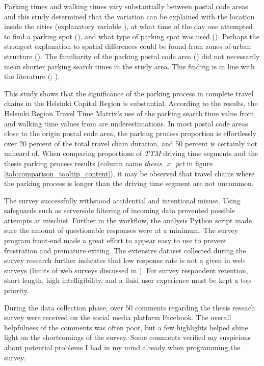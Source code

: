 Parking times and walking times vary substantially between postal code areas and this study determined that the variation can be explained with the location inside the cities (explanatory variable ), at what time of the day one attempted to find a parking spot (), and what type of parking spot was used (). Perhaps the strongest explanation to spatial differences could be found from zones of urban structure (). The familiarity of the parking postal code area () did not necessarily mean shorter parking search times in the study area. This finding is in line with the literature (\cite{Thompson1998}; \cite{Teng2002}).

This study shows that the significance of the parking process in complete travel chains in the Helsinki Capital Region is substantial. According to the results, the Helsinki Region Travel Time Matrix's use of the parking search time value from  and walking time values from  are underestimations. In most postal code areas close to the origin postal code area, the parking process proportion is effortlessly over 20 percent of the total travel chain duration, and 50 percent is certainly not unheard of. When comparing proportions of \textit{TTM} driving time segments and the thesis parking process results (column name \textit{thesis\_x\_pct} in figure \ref{tab:comparison_tooltip_content}), it may be observed that travel chains where the parking process is longer than the driving time segment are not uncommon. 

The survey successfully withstood accidential and intentional misuse. Using safeguards such as serverside filtering of incoming data prevented possible attempts at mischief. Further in the workflow, the analysis Python script made sure the amount of questionable responses were at a minimum. The survey program front-end made a great effort to appear easy to use to prevent frustration and premature exiting. The extensive dataset collected during the survey research further indicates that low response rate is not a given in web surveys (limits of web surveys discussed in ). For survey respondent retention, short length, high intelligibility, and a fluid user experience must be kept a top priority.

During the data collection phase, over 50 comments regarding the thesis reseach survey were received on the social media platform Facebook. The overall helpfulness of the comments was often poor, but a few highlights helped shine light on the shortcomings of the survey. Some comments verified my suspicions about potential problems I had in my mind already when programming the survey.


